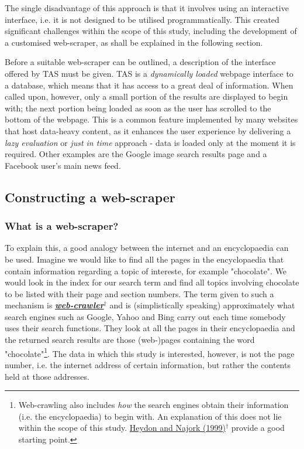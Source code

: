 \documentclass{article}
\begin{document}
The single disadvantage of this approach is that it involves using an interactive interface, i.e. it is not designed to be utilised programmatically. This created significant challenges within the scope of this study, including the development of a customised web-scraper, as shall be explained in the following section.

Before a suitable web-scraper can be outlined, a description of the interface offered by TAS must be given. TAS is a \emph{dynamically loaded} webpage interface to a database, which means that it has access to a great deal of information. When called upon, however, only a small portion of the results are displayed to begin with; the next portion being loaded as soon as the user has scrolled to the bottom of the webpage. This is a common feature implemented by many websites that host data-heavy content, as it enhances the user experience by delivering a \emph{lazy evaluation} or \emph{just in time} approach - data is loaded only at the moment it is required. Other examples are the Google image search results page and a Facebook user's main news feed.


\subsection{Constructing a web-scraper}
\label{sec-1-3}


\subsubsection{What is a web-scraper?}
\label{sec-1-3-1}

To explain this, a good analogy between the internet and an encyclopaedia can be used. Imagine we would like to find all the pages in the encyclopaedia that contain information regarding a topic of intereste, for example "chocolate". We would look in the index for our search term and find all topics involving chocolate to be listed with their page and section numbers. The term given to such a mechanism is \textbf{\href{https://en.wikipedia.org/wiki/Web_crawler}{\emph{web-crawler$^{\dag{}}$}}} and is (simplistically speaking) approximately what search engines such as Google, Yahoo and Bing carry out each time somebody uses their search functions. They look at all the pages in their encyclopaedia and the returned search results are those (web-)pages containing the word "chocolate"\footnote{Web-crawling also includes \emph{how} the search engines obtain their information (i.e. the encyclopaedia) to begin with. An explanation of this does not lie within the scope of this study. \href{http://link.springer.com/article/10.1023/A:1019213109274}{Heydon and Najork (1999)$^{\dag{}}$} provide a good starting point.}. The data in which this study is interested, however, is not the page number, i.e. the internet address of certain information, but rather the contents held at those addresses.
\end{document}
